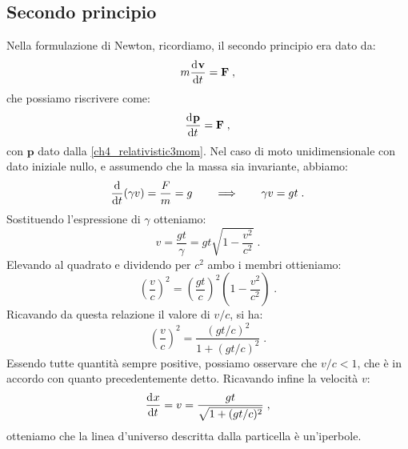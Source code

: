 \subsection{Secondo principio}
Nella formulazione di Newton, ricordiamo, il secondo principio era dato da:
\begin{equation}
m\frac{\mathrm{d}^{}\mathbf{v}}{\mathrm{d}t^{}}=\mathbf{F}\;,
\end{equation}
che possiamo riscrivere come:
\begin{equation}
\frac{\mathrm{d}^{}\mathbf{p}}{\mathrm{d}t^{}}=\mathbf{F}\;,
\end{equation}
con $\mathbf{p}$ dato dalla \eqref{ch4_relativistic3mom}. Nel caso di moto unidimensionale con dato iniziale nullo, e assumendo che la massa sia invariante, abbiamo:
\begin{equation}
\frac{\mathrm{d}}{\mathrm{d}{t}}(\gamma v)=\frac{F}{m}=g\qquad \Longrightarrow\qquad \gamma v = gt\;.
\end{equation}
Sostituendo l'espressione di $\gamma$ otteniamo:
\begin{equation}
v=\frac{gt}{\gamma}=gt\sqrt{1-\frac{v^2}{c^2}}\;.
\end{equation}
Elevando al quadrato e dividendo per $c^2$ ambo i membri ottieniamo:
\begin{equation}
\left(\frac{v}{c}\right)^2=\left(\frac{gt}{c}\right)^2\left(1-\frac{v^2}{c^2}\right)\;.
\end{equation}
Ricavando da questa relazione il valore di $v/c$, si ha:
\begin{equation}
 \left(\frac{v}{c}\right)^2=\frac{(gt/c)^2}{1+(gt/c)^2}\;.
\end{equation}
Essendo tutte quantità sempre positive, possiamo osservare che $v/c<1$, che è in accordo con quanto precedentemente detto. Ricavando infine la velocità $v$:
\begin{equation}
\frac{\mathrm{d}^{}x}{\mathrm{d}t^{}}=v=\frac{gt}{\sqrt{1+(gt/c)^2}}\;,
\end{equation}
otteniamo che la linea d'universo descritta dalla particella è un'iperbole. \\


